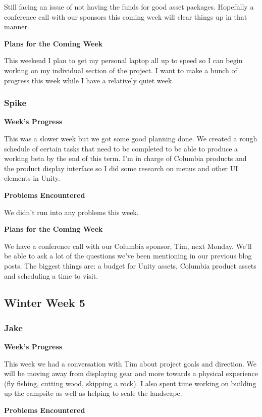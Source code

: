 \documentclass[10pt,journal,compsoc,onecolumn, draftclsnofoot]{IEEEtran}
\begin{document}
Still facing an issue of not having the funds for good asset packages.  Hopefully a conference call with our sponsors this coming week will clear things up in that manner.

\noindent \textbf{Plans for the Coming Week}

This weekend I plan to get my personal laptop all up to speed so I can begin working on my individual section of the project. I want to make a bunch of progress this week while I have a relatively quiet week.

\subsubsection{Spike}
\noindent \textbf{Week's Progress}

This was a slower week but we got some good planning done. We created a rough schedule of certain tasks that need to be completed to be able to produce a working beta by the end of this term. I'm in charge of Columbia products and the product display interface so I did some research on menus and other UI elements in Unity.

\noindent \textbf{Problems Encountered}

We didn't run into any problems this week.

\noindent \textbf{Plans for the Coming Week}

We have a conference call with our Columbia sponsor, Tim, next Monday. We'll be able to ask a lot of the questions we've been mentioning in our previous blog posts. The biggest things are: a budget for Unity assets, Columbia product assets and scheduling a time to visit.

\subsection{Winter Week 5}
\subsubsection{Jake}
\noindent \textbf{Week's Progress}

This week we had a conversation with Tim about project goals and direction. We will be moving away from displaying gear and more towards a physical experience (fly fishing, cutting wood, skipping a rock). I also spent time working on building up the campsite as well as helping to scale the landscape.

\noindent \textbf{Problems Encountered}
\end{document}
